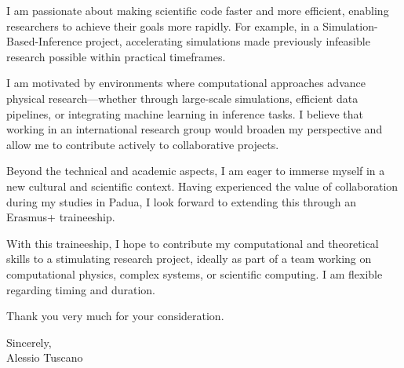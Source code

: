 \documentclass[a4paper,11pt]{article}
\begin{document}
I am passionate about making scientific code faster and more efficient, enabling researchers to achieve their goals more rapidly. For example, in a Simulation-Based-Inference project, accelerating simulations made previously infeasible research possible within practical timeframes.

I am motivated by environments where computational approaches advance physical research—whether through large-scale simulations, efficient data pipelines, or integrating machine learning in inference tasks. I believe that working in an international research group would broaden my perspective and allow me to contribute actively to collaborative projects.

Beyond the technical and academic aspects, I am eager to immerse myself in a new cultural and scientific context. Having experienced the value of collaboration during my studies in Padua, I look forward to extending this through an Erasmus+ traineeship.

With this traineeship, I hope to contribute my computational and theoretical skills to a stimulating research project, ideally as part of a team working on computational physics, complex systems, or scientific computing. I am flexible regarding timing and duration.

Thank you very much for your consideration.



\vspace{1em}
\noindent
Sincerely,\\[.4em]
Alessio Tuscano
\end{document}
